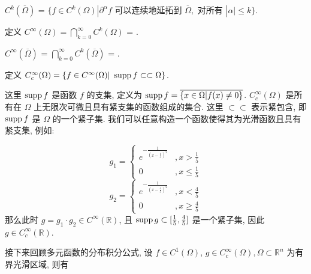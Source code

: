 \documentclass[11pt]{ctexart}[UTF8]
\begin{document}
\begin{remark}
    $C^k(\overline{\Omega})$ = $\{ f \in C^k(\Omega) | \partial^{\alpha} f \text{ 可以连续地延拓到 } \overline{\Omega}, \text{ 对所有 } |\alpha| \leq k \}$.
\end{remark}
\begin{definition}[无穷阶连续可微函数空间]
    定义 $C^\infty(\Omega) = \bigcap\limits_{k=0}^{\infty} C^k(\Omega)$ = .
    
\end{definition}
\begin{remark}
    $C^\infty(\overline{\Omega})$ = $\bigcap\limits_{k=0}^{\infty} C^k(\overline{\Omega})$ = .
\end{remark}
\begin{definition}[紧支集函数空间]
    定义 $C_c^\infty(\Omega) = \{ f \in C^\infty(\Omega) |\  \operatorname{supp} f \subset\subset \Omega \}$.
\end{definition}
这里 $\operatorname{supp} f$ 是函数 $f$ 的支集, 定义为 $\operatorname{supp} f = \overline{\{ x \in \Omega | f(x) \neq 0 \}}$. $C_c^\infty(\Omega)$ 是所有在 $\Omega$ 上无限次可微且具有紧支集的函数组成的集合. 这里 $\subset\subset$ 表示紧包含, 即 $\operatorname{supp} f$ 是 $\Omega$ 的一个紧子集.
我们可以任意构造一个函数使得其为光滑函数且具有紧支集, 例如:
\begin{example}
    \begin{equation*}
        g_{1} = \begin{cases}
            e^{-\frac{1}{(x-\frac{1}{5})^2}} & , x > \frac{1}{5} \\
            0 & ,x \leq \frac{1}{5}
        \end{cases}
    \end{equation*}
    \begin{equation*}
        g_{2} = \begin{cases}
            e^{-\frac{1}{(x-\frac{4}{5})^2}} & , x < \frac{4}{5} \\
            0 & ,x \geq \frac{4}{5}
        \end{cases}
    \end{equation*}
    那么此时 $g = g_{1} \cdot g_{2} \in C^{\infty}(\mathbb{R})$, 且 $\operatorname{supp} g \subset [\frac{1}{5}, \frac{4}{5}]$ 是一个紧子集, 因此 $g \in C_c^\infty(\mathbb{R})$.
\end{example}
接下来回顾多元函数的分布积分公式, 设 $f \in C^1(\Omega)$, $g \in C_c^\infty(\Omega), \Omega \subset \mathbb{R}^n$ 为有界光滑区域, 则有
\end{document}
